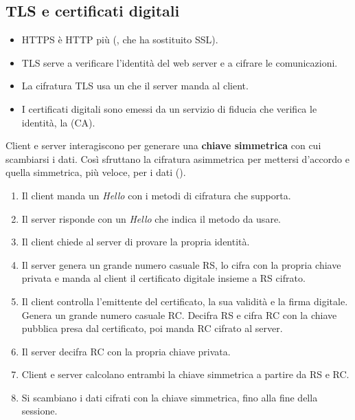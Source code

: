 \subsection{TLS e certificati digitali}
\label{sec:sic-tls}

\begin{itemize}
  \item HTTPS è HTTP più  (, che ha sostituito SSL).
  \item TLS serve a verificare l'identità del web server e a cifrare le comunicazioni.
  \item La cifratura TLS usa un  che il server manda al client.
  \item I certificati digitali sono emessi da un servizio di fiducia che verifica le identità, la  (CA).
\end{itemize}

Client e server interagiscono per generare una \textbf{chiave simmetrica} con cui scambiarsi i dati. Così sfruttano
la cifratura asimmetrica per mettersi d'accordo e quella simmetrica, più veloce, per i dati
().

\begin{algoritmo}
\begin{enumerate}
  \item Il client manda un \emph{Hello} con i metodi di cifratura che supporta.
  \item Il server risponde con un \emph{Hello} che indica il metodo da usare.
  \item Il client chiede al server di provare la propria identità.
  \item Il server genera un grande numero casuale RS, lo cifra con la propria chiave privata e manda al client il
    certificato digitale insieme a RS cifrato.
  \item Il client controlla l'emittente del certificato, la sua validità e la firma digitale. Genera un grande numero
    casuale RC. Decifra RS e cifra RC con la chiave pubblica presa dal certificato, poi manda RC cifrato al server.
  \item Il server decifra RC con la propria chiave privata.
  \item Client e server calcolano entrambi la chiave simmetrica a partire da RS e RC.
  \item Si scambiano i dati cifrati con la chiave simmetrica, fino alla fine della sessione.
\end{enumerate}
\end{algoritmo}

